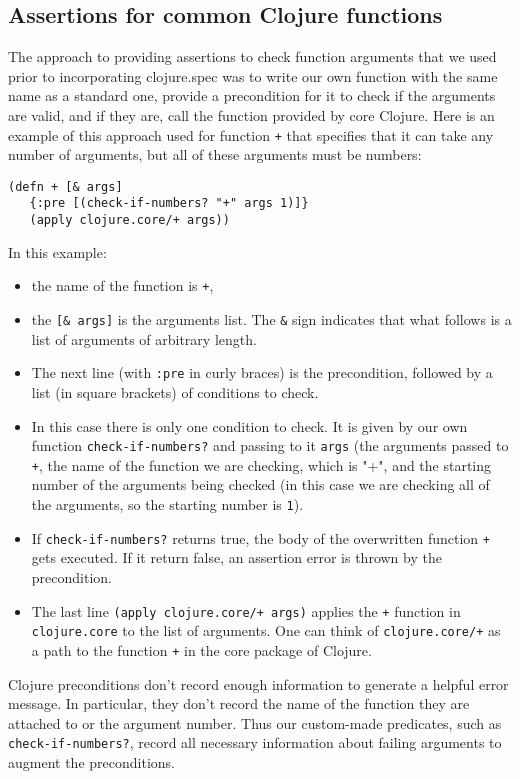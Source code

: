 \documentclass[12pt]{article}
\begin{document}
\subsection{Assertions for common Clojure functions}
The approach to providing assertions to check function arguments that we used prior to 
incorporating clojure.spec was to write our own function with the same name as a standard one, 
provide a precondition for it to check if the arguments are valid, and if they are, call 
the function provided by core Clojure. Here is an example of this approach used for
function {\tt +} that specifies that it can take any number of arguments, but all
of these arguments must be numbers:
\begin{verbatim}
(defn + [& args]
   {:pre [(check-if-numbers? "+" args 1)]}
   (apply clojure.core/+ args))
\end{verbatim} 
In this example:
\begin{itemize}
\item the name of the function is {\tt +}, 
\item the {\tt [\& args]} is the arguments list. The {\tt \&} sign indicates that what follows is
a list of arguments of arbitrary length. 
\item The next line (with {\tt :pre} in curly braces) is the precondition, followed by a list
(in square brackets) of conditions to check. 
\item In this case there is only one condition to check. It is given by our own 
function {\tt check-if-numbers?} 
and passing to it {\tt args} (the arguments passed to {\tt +}, the name of the function we 
are checking, which is "+", and the starting number of the arguments being checked 
(in this case we are checking all of the arguments, so the starting number is {\tt 1}). 
\item  If {\tt check-if-numbers?}  returns true, the body of the overwritten function {\tt +} 
gets executed. If it return false, an assertion error is thrown by the precondition. 
\item The last line {\tt  (apply clojure.core/+ args)} applies the {\tt +} function in 
{\tt clojure.core} to the list of arguments. One can think of {\tt  clojure.core/+} as 
a path to the function {\tt +} in the core package of Clojure. 
\end{itemize}
Clojure preconditions don't record enough information to generate a helpful error message. 
In particular, they don't record the name of the function they are attached to or the argument 
number. Thus our custom-made predicates, such as  {\tt check-if-numbers?}, record all 
necessary information about failing arguments to augment the preconditions. 
\end{document}
